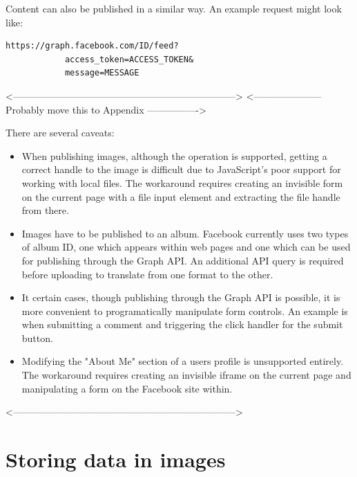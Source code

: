     
Content can also be published in a similar way. An example request might look like:

\FloatBarrier
    \begin{lstlisting}[label=code:pub,caption=Publishing POST request,float=h]
        https://graph.facebook.com/ID/feed?
            access_token=ACCESS_TOKEN&
            message=MESSAGE
    \end{lstlisting}
\FloatBarrier    

<--------------------------------------------------------------------->
<--------------------- Probably move this to Appendix ---------------->    

There are several caveats:

\begin{itemize}

    \item When publishing images, although the operation is supported, getting a correct handle to the image is difficult due to JavaScript's poor support for working with local files. The workaround requires creating an invisible form on the current page with a file input element and extracting the file handle from there.

    \item Images have to be published to an album. Facebook currently uses two types of album ID, one which appears within web pages and one which can be used for publishing through the Graph API. An additional API query is required before uploading to translate from one format to the other.
    
    \item It certain cases, though publishing through the Graph API is possible, it is more convenient to programatically manipulate form controls. An example is when submitting a comment and triggering the click handler for the submit button.
    
    \item Modifying the "About Me" section of a users profile is unsupported entirely. The workaround requires creating an invisible iframe on the current page and manipulating a form on the Facebook site within.

\end{itemize}

<--------------------------------------------------------------------->


    
\FloatBarrier
\section{Storing data in images}

